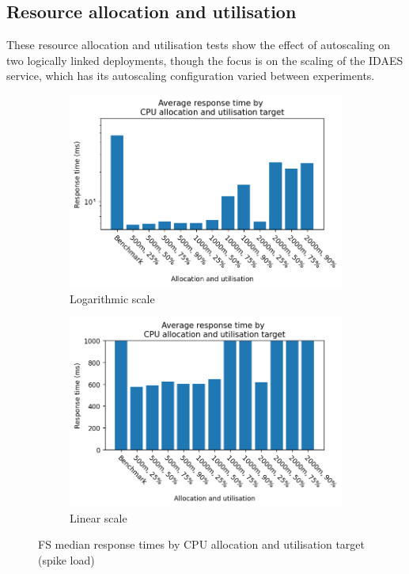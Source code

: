 \subsection{Resource allocation and utilisation}

These resource allocation and utilisation tests show the effect of autoscaling on two logically linked deployments, though the focus is on the scaling of the IDAES service, which has its autoscaling configuration varied between experiments.

\begin{figure}[H]
    \centering
    \begin{subfigure}{.5\textwidth}
      \centering
      \includegraphics[width=\linewidth]{figures/fs-rau-median-response-spike-log.png}
      \caption{Logarithmic scale}
    \end{subfigure}%
    \begin{subfigure}{.5\textwidth}
      \centering
      \includegraphics[width=\linewidth]{figures/fs-rau-median-response-spike-linear.png}
      \caption{Linear scale}
    \end{subfigure}

    \caption{FS median response times by CPU allocation and utilisation target (spike load)}
    \label{figure:fs-resource-allocation-rt-comp-spike}
\end{figure}

